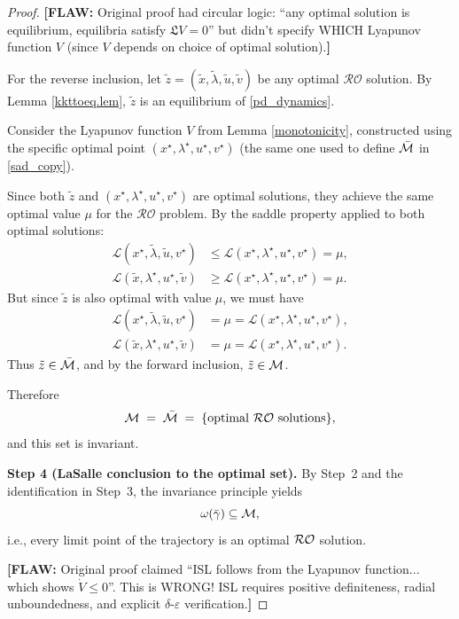 \documentclass[journal,twoside,web]{ieeecolor}
\newcommand{\rev}[1]{\textcolor{revisionblue}{#1}}
\newcommand{\purpletext}[1]{\textcolor{proofpurple}{#1}}
\newcommand{\flaw}[1]{\textcolor{reviewerred}{\textbf{[FLAW: }#1\textbf{]}}}
\begin{document}
\begin{proof}
\medskip
\flaw{Original proof had circular logic: ``any optimal solution is equilibrium, equilibria satisfy $\mathfrak{L}V=0$'' but didn't specify WHICH Lyapunov function $V$ (since $V$ depends on choice of optimal solution).}

\purpletext{For the reverse inclusion, let $\tilde{z} = (\tilde{x}, \tilde{\lambda}, \tilde{u}, \tilde{v})$ be any optimal $\mathcal{RO}$ solution. By Lemma \ref{kkttoeq.lem}, $\tilde{z}$ is an equilibrium of \eqref{pd_dynamics}.

Consider the Lyapunov function $V$ from Lemma \ref{monotonicity}, constructed using the specific optimal point $(x^\star, \lambda^\star, u^\star, v^\star)$ (the same one used to define $\bar{\cal M}$ in \eqref{sad_copy}).

Since both $\tilde{z}$ and $(x^\star, \lambda^\star, u^\star, v^\star)$ are optimal solutions, they achieve the same optimal value $\mu$ for the $\mathcal{RO}$ problem. By the saddle property applied to both optimal solutions:
\begin{align*}
\mathcal{L}(x^\star,\tilde{\lambda},\tilde{u},v^\star) &\leq \mathcal{L}(x^\star,\lambda^\star,u^\star,v^\star) = \mu,\\
\mathcal{L}(\tilde{x},\lambda^\star,u^\star,\tilde{v}) &\geq \mathcal{L}(x^\star,\lambda^\star,u^\star,v^\star) = \mu.
\end{align*}
But since $\tilde{z}$ is also optimal with value $\mu$, we must have
\begin{align*}
\mathcal{L}(x^\star,\tilde{\lambda},\tilde{u},v^\star) &= \mu = \mathcal{L}(x^\star,\lambda^\star,u^\star,v^\star),\\
\mathcal{L}(\tilde{x},\lambda^\star,u^\star,\tilde{v}) &= \mu = \mathcal{L}(x^\star,\lambda^\star,u^\star,v^\star).
\end{align*}
Thus $\tilde{z} \in \bar{\cal M}$, and by the forward inclusion, $\tilde{z} \in {\cal M}$.

Therefore
\[
{\cal M}\;=\;\bar{\cal M}\;=\;\{\text{optimal ${\cal RO}$ solutions}\},
\]
and this set is invariant.}

\medskip
\rev{\textbf{Step 4 (LaSalle conclusion to the optimal set).}
By Step~2 and the identification in Step~3, the invariance principle yields
\[
\omega(\bar\gamma)\subseteq {\cal M},
\]
i.e., every limit point of the trajectory is an optimal ${\cal RO}$ solution.}

\medskip
\flaw{Original proof claimed ``ISL follows from the Lyapunov function... which shows $\dot{V} \leq 0$''. This is WRONG! ISL requires positive definiteness, radial unboundedness, and explicit $\delta$-$\varepsilon$ verification.}


\end{proof}
\end{document}
